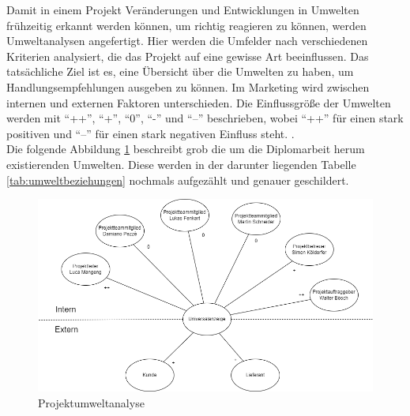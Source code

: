 Damit in einem Projekt Veränderungen und Entwicklungen in Umwelten frühzeitig erkannt werden können, um richtig reagieren zu können, werden Umweltanalysen angefertigt. Hier werden die Umfelder nach verschiedenen Kriterien analysiert, die das Projekt auf eine gewisse Art beeinflussen. Das tatsächliche Ziel ist es, eine Übersicht über die Umwelten zu haben, um Handlungsempfehlungen ausgeben zu können. Im Marketing wird zwischen internen und externen Faktoren unterschieden. Die Einflussgröße der Umwelten werden mit \enquote{++}, \enquote{+}, \enquote{0}, \enquote{-} und \enquote{--} beschrieben, wobei \enquote{++} für einen stark positiven und \enquote{--} für einen stark negativen Einfluss steht. \cite[vgl.][]{Wikipedia:2023, Redaktion:2024}. \\
Die folgende Abbildung \ref{fig:umweltanalyse} beschreibt grob die um die Diplomarbeit herum existierenden Umwelten. Diese werden in der darunter liegenden Tabelle \ref{tab:umweltbeziehungen} nochmals aufgezählt und genauer geschildert.

\begin{figure}[H]
	\centering
	\includegraphics[width=15cm]{Bilder/pua.png}
	\caption{Projektumweltanalyse}
	\label{fig:umweltanalyse}
\end{figure}

